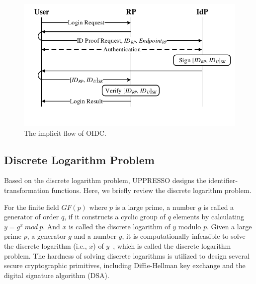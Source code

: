 \begin{figure}[t]
  \centering
  \includegraphics[width=0.95\linewidth]{fig/OIDC1.pdf}
  \caption{The implicit flow of OIDC.}
  \label{fig:OpenID}
\end{figure}

\subsection{Discrete Logarithm Problem}
\label{sec:dlp}

Based on the discrete logarithm problem, UPPRESSO designs the identifier-transformation functions. %
Here, we briefly review the discrete logarithm problem.

For the finite field $GF(p)$ where $p$ is a large prime, a number $g$ is called a generator of order $q$, if it constructs a cyclic  group of $q$ elements by calculating $y=g^x \ mod\ p$.
And $x$ is called the discrete logarithm of $y$ modulo $p$. Given a large prime $p$, a generator $g$ and a number $y$, it is computationally infeasible to solve the discrete logarithm (i.e., $x$) of $y$~\cite{WXWM}, which is called the discrete logarithm problem.
The hardness of solving discrete logarithms is utilized to design several secure cryptographic primitives, including Diffie-Hellman key exchange and the digital signature algorithm (DSA).

